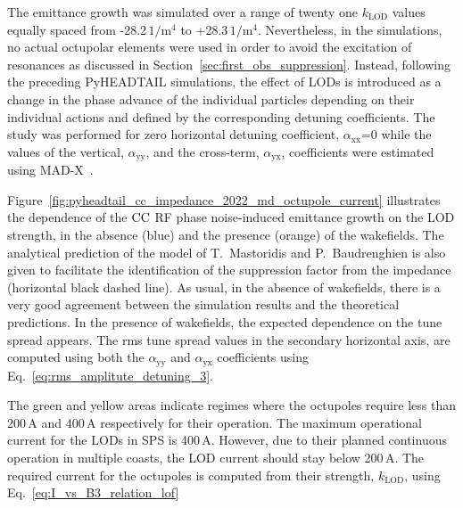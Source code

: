 The emittance growth was simulated over a range of twenty one $k_\mathrm{LOD}$ values equally spaced from -28.2\,$\mathrm{1/m^4}$ to +28.3\,$\mathrm{1/m^4}$. Nevertheless, in the simulations, no actual octupolar elements were used in order to avoid the excitation of resonances as discussed in Section~\ref{sec:first_obs_suppression}. Instead, following the preceding PyHEADTAIL simulations, the effect of LODs is introduced as a change in the phase advance of the individual particles depending on their individual actions and defined by the corresponding detuning coefficients. The study was performed for zero horizontal detuning coefficient, $\alpha_{\mathrm{xx}}$=0 while the values of the vertical, $\alpha_{\mathrm{yy}}$, and the cross-term, $\alpha_{\mathrm{yx}}$, coefficients were estimated using MAD-X~\cite{madx}.

Figure~\ref{fig:pyheadtail_cc_impedance_2022_md_octupole_current} illustrates the dependence of the ${\mathrm{CC}}$ RF phase noise-induced emittance growth on the LOD strength, in the absence (blue) and the presence (orange) of the wakefields. The analytical prediction of the model of T.~Mastoridis and P.~Baudrenghien is also given to facilitate the identification of the suppression factor from the impedance (horizontal black dashed line). As usual, in the absence of wakefields, there is a very good agreement between the simulation results and the theoretical predictions. In the presence of wakefields, the expected dependence on the tune spread appears. The rms tune spread values in the secondary horizontal axis, are computed using both the $\alpha_{\mathrm{yy}}$ and $\alpha_{\mathrm{yx}}$ coefficients using Eq.~\eqref{eq:rms_amplitute_detuning_3}.

The green and yellow areas indicate regimes where the octupoles require less than 200\,A and 400\,A respectively for their operation. The maximum operational current for the LODs in SPS is 400\,A. However, due to their planned continuous operation in multiple coasts, the LOD current should stay below 200\,A. The required current for the octupoles is computed from their strength, $k_\mathrm{LOD}$, using Eq.~\eqref{eq:I_vs_B3_relation_lof}


